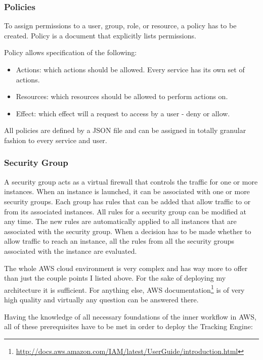 \subsubsection*{Policies}

To assign permissions to a user, group, role, or resource, a policy has to be created. Policy is a document that explicitly lists permissions.

Policy allows specification of the following:

\begin{itemize}
	\item Actions: which actions should be allowed. Every service has its own set of actions.
	\item Resources: which resources should be allowed to perform actions on.
	\item Effect: which effect will a request to access by a user - deny or allow.
\end{itemize}

All policies are defined by a JSON file and can be assigned in totally granular fashion to every service and user.


\subsubsection*{Security Group}

A security group acts as a virtual firewall that controls the traffic for one or more instances. When an instance is launched, it can be associated with one or more security groups. Each group has rules that can be added that allow traffic to or from its associated instances. All rules for a security group can be modified at any time. The new rules are automatically applied to all instances that are associated with the security group. When a decision has to be made whether to allow traffic to reach an instance, all the rules from all the security groups associated with the instance are evaluated.

\bigbreak

The whole AWS cloud environment is very complex and has way more to offer than just the couple points I listed above. For the sake of deploying my architecture it is sufficient. For anything else, AWS documentation\footnote{\url{http://docs.aws.amazon.com/IAM/latest/UserGuide/introduction.html}} is of very high quality and virtually any question can be answered there.

\newpage

Having the knowledge of all necessary foundations of the inner workflow in AWS, all of these prerequisites have to be met in order to deploy the Tracking Engine:

